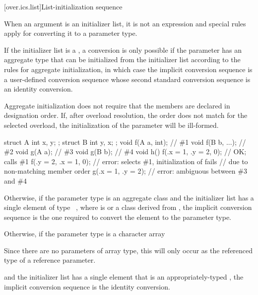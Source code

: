 [over.ics.list]{List-initialization sequence}

\pnum
When an argument is an initializer list, it is not an %
expression and special rules apply for converting it to a parameter type.

\pnum
If the initializer list is a ,
a conversion is only possible if
the parameter has an aggregate type
that can be initialized from the initializer list
according to the rules for aggregate initialization,
in which case the implicit conversion sequence is
a user-defined conversion sequence
whose second standard conversion sequence
is an identity conversion.
\begin{note}
Aggregate initialization does not require that
the members are declared in designation order.
If, after overload resolution, the order does not match
for the selected overload,
the initialization of the parameter will be ill-formed.
\begin{example}
\begin{codeblock}
struct A { int x, y; };
struct B { int y, x; };
void f(A a, int);               // \#1
void f(B b, ...);               // \#2
void g(A a);                    // \#3
void g(B b);                    // \#4
void h() {
  f({.x = 1, .y = 2}, 0);       // OK; calls \#1
  f({.y = 2, .x = 1}, 0);       // error: selects \#1, initialization of  fails
                                // due to non-matching member order
  g({.x = 1, .y = 2});          // error: ambiguous between \#3 and \#4
}
\end{codeblock}
\end{example}
\end{note}

\pnum
Otherwise,
if the parameter type is an aggregate class  and the initializer list has a
single element of type \cv{}~, where  is 
or a class derived from , the implicit conversion sequence is the one
required to convert the element to the parameter type.

\pnum
Otherwise, if the parameter type is a character array
\begin{footnote}
Since there are no parameters of array type,
this will only occur as the referenced type of a reference parameter.
\end{footnote}
and the initializer list has a single element that is an appropriately-typed
, the implicit conversion
sequence is the identity conversion.

